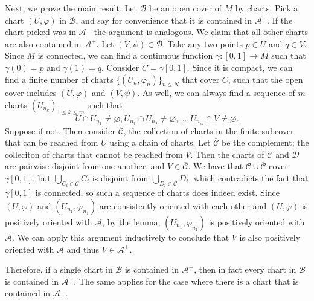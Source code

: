 \documentclass{../../../tex-setup/eh-homework}
\begin{document}
\begin{question}{44}
        Next, we prove the main result. Let \(\mathcal{B}\) be an open cover of \(M\) by charts. Pick a chart \((U, \varphi)\) in \(\mathcal{B}\), and say for convenience that it is contained in \(\mathcal{A} ^+\). If the chart picked was in \(\mathcal{A} ^-\) the argument is analogous. We claim that all other charts are also contained in \(\mathcal{A} ^+\). Let \((V, \psi) \in \mathcal{B}\). Take any two points \(p \in U\) and \(q \in V\). Since \(M\) is connected, we can find a continuous function \(\gamma : [0,1] \to M\) such that \(\gamma (0) = p\) and \(\gamma (1) = q\). Consider \(C = \gamma [0,1]\). Since it is compact, we can find a finite number of charts \(\{ (U_n, \varphi_n) \} _{n \leq N}\) that cover \(C\), such that the open cover includes \((U, \varphi)\) and \((V, \psi)\). As well, we can always find a sequence of \(m\) charts \((U_{n_k})_{1 \leq k \leq m}\) such that
        \[
            U \cap U_{n_1} \neq \varnothing , U_{n_1} \cap U_{n_2} \neq \varnothing , \ldots , U_{n_{m}} \cap V \neq \varnothing.
        \]
        Suppose if not. Then consider \(\mathcal{C} \), the collection of charts in the finite subcover that can be reached from \(U\) using a chain of charts. Let \(\overline{\mathcal{C}}\) be the complement; the colleciton of charts that cannot be reached from \(V\). Then the charts of \(\mathcal{C}\) and \(\mathcal{D}\) are pairwise disjoint from one another, and \(V \in \overline{\mathcal{C}}\). We have that \(\mathcal{C} \cup \overline{\mathcal{C}}\) cover \(\gamma [0,1]\), but \(\bigcup_{C_i \in \mathcal{C}} C_i\) is disjoint from \(\bigcup_{D_i \in \overline{\mathcal{C}}} D_i\), which contradicts the fact that \(\gamma [0,1]\) is connected, so such a sequence of charts does indeed exist. Since \((U, \varphi)\) and \((U_{n_1}, \varphi_{n_1})\) are consistently oriented with each other and \((U, \varphi)\) is positively oriented with \(\mathcal{A}\), by the lemma, \((U_{n_1}, \varphi_{n_1})\) is positively oriented with \(\mathcal{A}\). We can apply this argument inductively to conclude that \(V\) is also positively oriented with \(\mathcal{A}\) and thus \(V \in \mathcal{A} ^+\).

        Therefore, if a single chart in \(\mathcal{B}\) is contained in \(\mathcal{A}^+\), then in fact every chart in \(\mathcal{B}\) is contained in \(\mathcal{A}^+\). The same applies for the case where there is a chart that is contained in \(\mathcal{A}^-\).
    \end{question}
\end{document}
